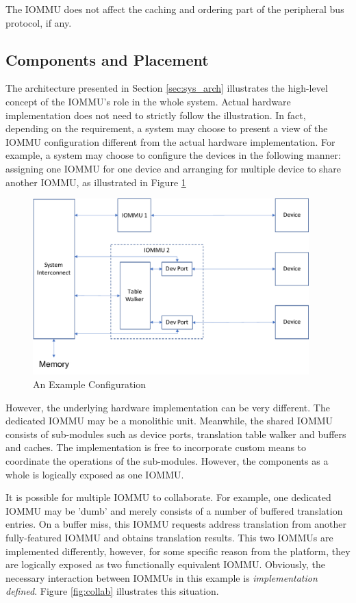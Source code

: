 The IOMMU does not affect the caching and ordering part of the peripheral bus protocol, if
any.

\subsection{Components and Placement}

The architecture presented in Section \ref{sec:sys_arch} illustrates the high-level
concept of the IOMMU's role in the whole system. Actual hardware implementation does not
need to strictly follow the illustration. In fact, depending on the requirement, a system
may choose to present a view of the IOMMU configuration different from the actual hardware
implementation. For example, a system may choose to configure the devices in the following
manner: assigning one IOMMU for one device and arranging for multiple device to share
another IOMMU, as illustrated in Figure \ref{fig:cmp_plcmnt}

\begin{figure}[ht!]
    \centering
    \includegraphics[width=0.95\textwidth]{img/cmp_plcmnt.pdf}
    \caption{An Example Configuration}
    \label{fig:cmp_plcmnt}
\end{figure}

However, the underlying hardware implementation can be very different. The dedicated IOMMU
may be a monolithic unit. Meanwhile, the shared IOMMU consists of sub-modules such as
device ports, translation table walker and buffers and caches. The implementation is
free to incorporate custom means to coordinate the operations of the sub-modules. However,
the components as a whole is logically exposed as one IOMMU.

It is possible for multiple IOMMU to collaborate. For example, one dedicated IOMMU may be
'dumb' and merely consists of a number of buffered translation entries. On a buffer miss,
this IOMMU requests address translation from another fully-featured IOMMU and obtains
translation results. This two IOMMUs are implemented differently, however, for some
specific reason from the platform, they are logically exposed as two functionally
equivalent IOMMU. Obviously, the necessary interaction between IOMMUs in this example is
\textit{implementation defined}. Figure \ref{fig:collab} illustrates this situation.

